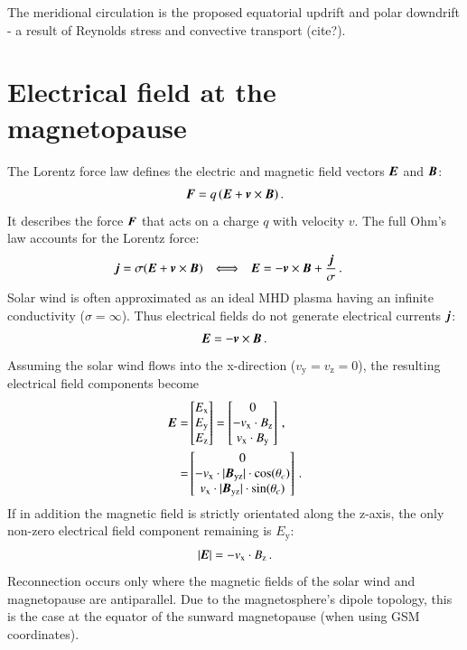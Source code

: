 
The meridional circulation is the proposed equatorial updrift and polar downdrift - a result of Reynolds stress and convective transport (cite?).\\


\section{Electrical field at the magnetopause}
\label{sec:electrical_field_at_the_magnetopause}
The Lorentz force law defines the electric and magnetic field vectors $\boldsymbol{E}$ and $\boldsymbol{B}$:
\begin{align}
	\boldsymbol{F} = q\,(\boldsymbol{E} + \boldsymbol{v} \times \boldsymbol{B})	\,.
\end{align}
It describes the force $\boldsymbol{F}$ that acts on a charge $q$ with velocity $v$. The full Ohm's law accounts for the Lorentz force:
\begin{align}
	\boldsymbol{j} &= \sigma(\boldsymbol{E} + \boldsymbol{v} \times \boldsymbol{B})	& \Longleftrightarrow	&	&	\boldsymbol{E} &= - \boldsymbol{v} \times \boldsymbol{B} + \frac{\boldsymbol{j}}{\sigma}	\,.
\end{align}
Solar wind is often approximated as an ideal MHD plasma having an infinite conductivity ($\sigma = \infty$). Thus electrical fields do not generate electrical currents $\boldsymbol{j}$:
\begin{align}
	\boldsymbol{E} = - \boldsymbol{v} \times \boldsymbol{B}	\,.
\end{align}
Assuming the solar wind flows into the x-direction ($v_\text{y} = v_\text{z} = 0$), the resulting electrical field components become
\begin{align}
	\boldsymbol{E} =& \begin{bmatrix}
		E_\text{x}\\
		E_\text{y}\\
		E_\text{z}\\
	\end{bmatrix} = \begin{bmatrix}
		0\\
		- v_\text{x} \cdot B_\text{z}\\
		v_\text{x} \cdot B_\text{y}
	\end{bmatrix}	\,,\\
		=& \begin{bmatrix}
		0\\
		- v_\text{x} \cdot |\boldsymbol{B_\text{yz}}| \cdot \cos(\theta_c)\\
		v_\text{x} \cdot |\boldsymbol{B_\text{yz}}| \cdot \sin(\theta_c)\\
	\end{bmatrix}	\,.
\end{align}
If in addition the magnetic field is strictly orientated along the z-axis, the only non-zero electrical field component remaining is $E_\text{y}$:
\begin{align}
	|\boldsymbol{E}| = - v_\text{x} \cdot B_\text{z}	\,.
\end{align}
Reconnection occurs only where the magnetic fields of the solar wind and magnetopause are antiparallel. Due to the magnetosphere's dipole topology, this is the case at the equator of the sunward magnetopause (when using GSM coordinates).

